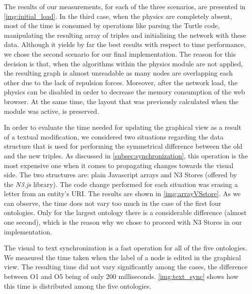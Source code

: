 The results of our measurements, for each of the three scenarios, are presented in \autoref{img:initial_load}. In the third case, when the physics are completely absent, most of the time is consumed by operations like parsing the Turtle code, manipulating the resulting array of triples and initializing the network with these data. Although it yields by far the best results with respect to time performance, we chose the second scenario for our final implementation. The reason for this decision is that, when the algorithms within the physics module are not applied, the resulting graph is almost unreadable as many nodes are overlapping each other due to the lack of repulsion forces. Moreover, after the network load, the physics can be disabled in order to decrease the memory consumption of the web browser. At the same time, the layout that was previously calculated when the module was active, is preserved.

In order to evaluate the time needed for updating the graphical view as a result of a textual modification, we considered two situations regarding the data structure that is used for performing the symmetrical difference between the old and the new triples. As discussed in \autoref{subsec:synchronization}, this operation is the most expensive one when it comes to propagating changes towards the visual side. The two structures are: plain Javascript arrays and N3 Stores (offered by the \textit{N3.js} library). The code change performed for each situation was erasing a letter from an entity's URI. The results are shown in \autoref{img:arrayVSstore}. As we can observe, the time does not vary too much in the case of the first four ontologies. Only for the largest ontology there is a considerable difference (almost one second), which is the reason why we chose to proceed with N3 Stores in our implementation.

The visual to text synchronization is a fast operation for all of the five ontologies. We measured the time taken when the label of a node is edited in the graphical view. The resulting time did not vary significantly among the cases, the difference between O1 and O5 being of only 200 milliseconds. \autoref{img:text_sync} shows how this time is distributed among the five ontologies.

